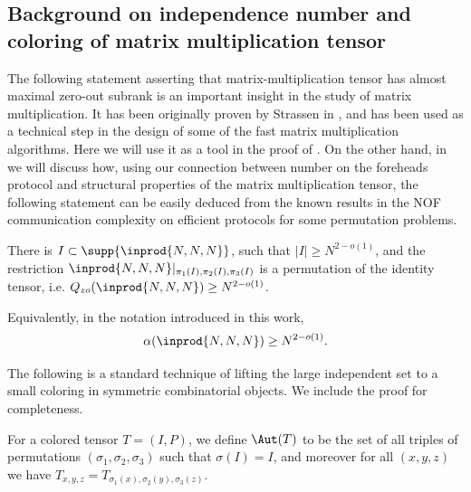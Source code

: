 \subsection{Background on independence number and coloring of matrix multiplication tensor}
The following statement asserting that matrix-multiplication tensor has almost maximal zero-out subrank is an important insight in the study of matrix multiplication. It has been originally proven by Strassen in \cite{S87}, and has been used as a technical step in the design of some of the fast matrix multiplication algorithms. Here we will use it as a tool in the proof of . On the other hand, in  we will discuss how, using our connection between number on the foreheads protocol and structural properties of the matrix multiplication tensor, the following statement can be easily deduced from the known results in the NOF communication complexity on efficient protocols for some permutation problems. 
\begin{theorem}[\cite{S87}]
There is $I \subset \supp{\inprod{N,N,N}}$, such that $|I| \geq N^{2 - o(1)}$, and the restriction $\inprod{N,N,N}|_{\pi_1(I), \pi_2(I), \pi_3(I)}$ is a permutation of the identity tensor, i.e. $Q_{zo}(\inprod{N,N,N}) \geq N^{2 - o(1)}$.

Equivalently, in the notation introduced in this work, 
\begin{equation*}
    \alpha(\inprod{N,N,N}) \geq N^{2 - o(1)}.
\end{equation*}
\end{theorem}

The following is a standard technique of lifting the large independent set to a small coloring in symmetric combinatorial objects. We include the proof for completeness.
\begin{definition}
    For a colored tensor $T = (I, P)$, we define $\Aut(T)$ to be the set of all triples of permutations $(\sigma_1, \sigma_2, \sigma_3)$ such that $\sigma(I) = I$, and moreover for all $(x,y,z)$ we have $T_{x,y,z} = T_{\sigma_1(x), \sigma_2(y), \sigma_3(z)}$.
\end{definition}

